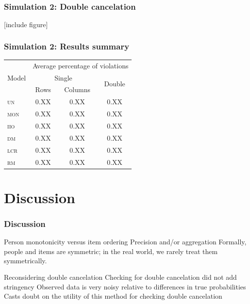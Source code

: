 \documentclass[10pt,serif,professionalfont]{beamer}
\begin{document}
\begin{frame}
    \frametitle{Simulation 2: Double cancelation}

    [include figure]

\end{frame}

\begin{frame}
    \frametitle{Simulation 2: Results summary}

    \begin{center}
    \begin{tabular}{lccc}
    \toprule
     \multirow{3}{*}{Model} & \multicolumn{3}{c}{Average percentage of violations} \\ \cmidrule(lr){2-4}
                & \multicolumn{2}{c}{Single} & \multirow{2}{*}{Double} \\ \cmidrule(lr){2-3}
                  & Rows       & Columns    &            \\
    \midrule
     \textsc{un}  & 0.XX & 0.XX & 0.XX \\
     \textsc{mon} & 0.XX & 0.XX & 0.XX \\
     \textsc{iio} & 0.XX & 0.XX & 0.XX \\
     \textsc{dm}  & 0.XX & 0.XX & 0.XX \\
     \textsc{lcr} & 0.XX & 0.XX & 0.XX \\
     \textsc{rm}  & 0.XX & 0.XX & 0.XX \\
    \bottomrule
    \end{tabular}
    \end{center}

\end{frame}

\section{Discussion}

\begin{frame}
    \frametitle{Discussion}

    \begin{outline}
        \1 Person monotonicity versus item ordering
            \2 Precision and/or aggregation 
            \2 Formally, people and items are symmetric; in the real world, we rarely treat them symmetrically.  

        \vspace{0.25cm}

        \1 Reconsidering double cancelation
            \2 Checking for double cancelation did not add stringency
            \2 Observed data is very noisy relative to differences in true probabilities
            \2 Casts doubt on the utility of this method for checking double cancelation

    \end{outline}

\end{frame}
\end{document}
